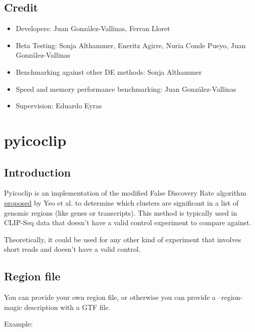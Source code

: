 \documentclass[letterpaper,10pt,english]{sphinxmanual}
\begin{document}
\subsection{Credit}
\label{pyicoenrich:credit}\begin{itemize}
\item {} 
Developers: Juan González-Vallinas, Ferran Lloret

\item {} 
Beta Testing: Sonja Althammer, Eneritz Agirre, Nuria Conde Pueyo, Juan González-Vallinas

\item {} 
Benchmarking against other DE methods: Sonja Althammer

\item {} 
Speed and memory performance benchmarking: Juan González-Vallinas

\item {} 
Supervision: Eduardo Eyras

\end{itemize}


\section{pyicoclip}
\label{pyicoclip:pyicoclip}\label{pyicoclip::doc}

\subsection{Introduction}
\label{pyicoclip:introduction}
Pyicoclip is an implementation of the modified False Discovery Rate algorithm \href{http://www.nature.com/nsmb/journal/v16/n2/full/nsmb.1545.html}{proposed} by Yeo et al. to determine which clusters are significant in a list of genomic regions (like genes or transcripts). This method is typically used in CLIP-Seq data that doesn't have a valid control experiment to compare against.

Theoretically, it could be used for any other kind of experiment that involves short reads and doesn't have a valid control.


\subsection{Region file}
\label{pyicoclip:region-file}
You can provide your own region file, or otherwise you can provide a --region-magic description with a GTF file.

Example:
\end{document}
